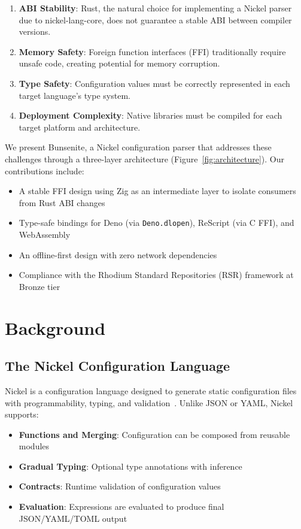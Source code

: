 \documentclass[11pt,a4paper]{article}
\begin{document}
\begin{enumerate}
    \item \textbf{ABI Stability}: Rust, the natural choice for implementing a Nickel parser due to nickel-lang-core, does not guarantee a stable ABI between compiler versions.
    \item \textbf{Memory Safety}: Foreign function interfaces (FFI) traditionally require unsafe code, creating potential for memory corruption.
    \item \textbf{Type Safety}: Configuration values must be correctly represented in each target language's type system.
    \item \textbf{Deployment Complexity}: Native libraries must be compiled for each target platform and architecture.
\end{enumerate}

We present Bunsenite, a Nickel configuration parser that addresses these challenges through a three-layer architecture (Figure~\ref{fig:architecture}). Our contributions include:

\begin{itemize}
    \item A stable FFI design using Zig as an intermediate layer to isolate consumers from Rust ABI changes
    \item Type-safe bindings for Deno (via \texttt{Deno.dlopen}), ReScript (via C FFI), and WebAssembly
    \item An offline-first design with zero network dependencies
    \item Compliance with the Rhodium Standard Repositories (RSR) framework at Bronze tier
\end{itemize}

\section{Background}

\subsection{The Nickel Configuration Language}

Nickel is a configuration language designed to generate static configuration files with programmability, typing, and validation~\cite{nickel}. Unlike JSON or YAML, Nickel supports:

\begin{itemize}
    \item \textbf{Functions and Merging}: Configuration can be composed from reusable modules
    \item \textbf{Gradual Typing}: Optional type annotations with inference
    \item \textbf{Contracts}: Runtime validation of configuration values
    \item \textbf{Evaluation}: Expressions are evaluated to produce final JSON/YAML/TOML output
\end{itemize}
\end{document}
